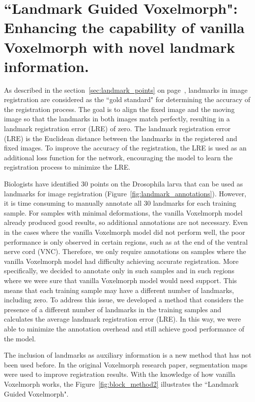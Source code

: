 \documentclass{book}
\begin{document}
	\section{``Landmark Guided Voxelmorph": Enhancing the capability of vanilla Voxelmorph with novel landmark information.}
	As described in the section~\ref{sec:landmark_points} on page~\pageref{sec:landmark_points}, landmarks in image registration are considered as the ``gold standard" for determining the accuracy of the registration process. The goal is to align the fixed image and the moving image so that the landmarks in both images match perfectly, resulting in a landmark registration error (LRE) of zero. The landmark registration error (LRE) is the Euclidean distance between the landmarks in the registered and fixed images. To improve the accuracy of the registration, the LRE is used as an additional loss function for the network, encouraging the model to learn the registration process to minimize the LRE.
	
	Biologists have identified 30 points on the Drosophila larva that can be used as landmarks for image registration (Figure~\ref{fig:landmark_annotations}). However, it is time consuming to manually annotate all 30 landmarks for each training sample. For samples with minimal deformations, the vanilla Voxelmorph model already produced good results, so additional annotations are not necessary. Even in the cases where the vanilla Voxelmorph model did not perform well, the poor performance is only observed in certain regions, such as at the end of the ventral nerve cord (VNC). Therefore, we only require annotations on samples where the vanilla Voxelmorph model had difficulty achieving accurate registration. More specifically, we decided to annotate only in such samples and in such regions where we were sure that vanilla Voxelmorph model would need support. This means that each training sample may have a different number of landmarks, including zero. To address this issue, we developed a method that considers the presence of a different number of landmarks in the training samples and calculates the average landmark registration error (LRE). In this way, we were able to minimize the annotation overhead and still achieve good performance of the model.
	
	The inclusion of landmarks as auxiliary information is a new method that has not been used before. In the original Voxelmorph research paper, segmentation maps were used to improve registration results. With the knowledge of how vanilla Voxelmorph works, the Figure~\ref{fig:block_method2} illustrates the ``Landmark Guided Voxelmorph".
	
\end{document}
